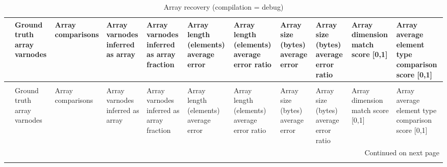 \begin{longtable}{lp{1.8cm}p{1.8cm}p{1.8cm}p{1.8cm}p{1.8cm}p{1.8cm}p{1.8cm}p{1.8cm}p{1.8cm}p{1.8cm}}
\caption{Array recovery (compilation = debug)}
\label{table:array-comparisons-O0-debug}\\
\toprule
{} &  Ground truth array varnodes &  Array comparisons &  Array varnodes inferred as array &  Array varnodes inferred as array fraction &  Array length (elements) average error &  Array length (elements) average error ratio &  Array size (bytes) average error &  Array size (bytes) average error ratio &  Array dimension match score [0,1] &  Array average element type comparison score [0,1] \\
\midrule
\endfirsthead
\caption[]{Array recovery (compilation = debug)} \\
\toprule
{} &  Ground truth array varnodes &  Array comparisons &  Array varnodes inferred as array &  Array varnodes inferred as array fraction &  Array length (elements) average error &  Array length (elements) average error ratio &  Array size (bytes) average error &  Array size (bytes) average error ratio &  Array dimension match score [0,1] &  Array average element type comparison score [0,1] \\
\midrule
\endhead
\midrule
\multicolumn{11}{r}{{Continued on next page}} \\
\midrule
\endfoot


\end{longtable}
